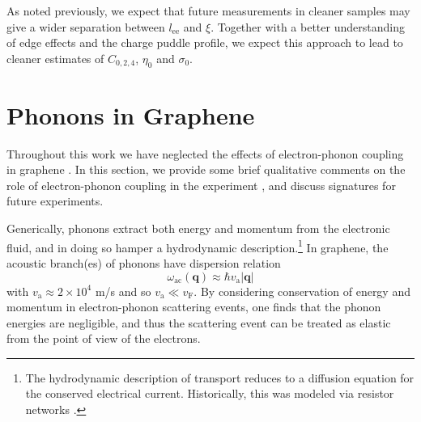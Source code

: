 As noted previously, we expect that future measurements in cleaner samples may give a wider separation between $l_{\mathrm{ee}}$ and $\xi$.   Together with a better understanding of edge effects and the charge puddle profile, we expect this approach to lead to cleaner estimates of $C_{0,2,4}$, $\eta_0$ and $\sigma_0$. 

\section{Phonons in Graphene}\label{section:AL_secphonon}
Throughout this work we have neglected the effects of electron-phonon coupling in graphene \cite{fong_ultrasensitive_2012, fong_measurement_2013}.   In this section, we provide some brief qualitative comments on the role of electron-phonon coupling in the experiment \cite{crossno_observation_2016}, and discuss signatures for future experiments.

Generically, phonons extract both energy and momentum from the electronic fluid, and in doing so hamper a hydrodynamic description.\footnote{The hydrodynamic description of transport reduces to a diffusion equation for the conserved electrical current.   Historically, this was modeled via resistor networks \cite{kirkpatrick_classical_1971, derrida_transfer-matrix_1982}.}  In graphene, the acoustic branch(es) of phonons have dispersion relation \cite{hwang_acoustic_2008} \begin{equation}
\omega_{\mathrm{ac}}(\mathbf{q}) \approx \hbar v_{\mathrm{a}} |\mathbf{q}|
\end{equation} with  $v_{\mathrm{a}}\approx 2\times 10^4 $ m/s and so $v_{\mathrm{a}} \ll v_{\mathrm{F}}$.   By considering conservation of energy and momentum in electron-phonon scattering events, one finds that the phonon energies are negligible, and thus the scattering event can be treated as elastic from the point of view of the electrons.

